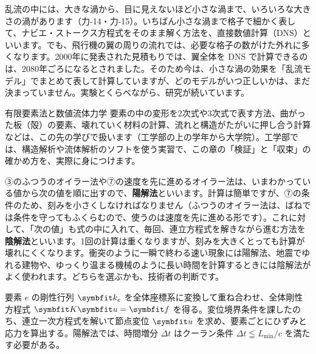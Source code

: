 \begin{phmada}
乱流の中には、大きな渦から、目に見えないほど小さな渦まで、いろいろな大きさの渦があります（力-14・力-15）。いちばん小さな渦まで格子で細かく表して、ナビエ・ストークス方程式をそのまま解く方法を、直接数値計算（DNS）といいます。でも、飛行機の翼の周りの流れでは、必要な格子の数がけた外れに多くなります。2000年に発表された見積もりでは、翼全体を DNS で計算できるのは、2080年ごろになるとされました。そのため今は、小さな渦の効果を「乱流モデル」でまとめて表して計算していますが、どのモデルがいつ正しいかは、まだ決まっていません。実験とくらべながら、研究が続いています。
\end{phmada}
\begin{phsaki}{有限要素法と数値流体力学}
要素の中の変形を2次式や3次式で表す方法、曲がった板（殻）の要素、壊れていく材料の計算、流れと構造がたがいに押し合う計算などは、この先の学びで扱います（工学部の上の学年から大学院）。工学部では、構造解析や流体解析のソフトを使う実習で、この章の「検証」と「収束」の確かめ方を、実際に身につけます。
\end{phsaki}
\begin{motto}[5]
③のふつうのオイラー法や⑦の速度を先に進めるオイラー法は、いまわかっている値から次の値を順に出すので、\textbf{陽解法}といいます。計算は簡単ですが、⑦の条件のため、刻みを小さくしなければなりません（ふつうのオイラー法は、ばねでは条件を守ってもふくらむので、使うのは速度を先に進める形です）。これに対して、「次の値」も式の中に入れて、毎回、連立方程式を解きながら進む方法を\textbf{陰解法}といいます。1回の計算は重くなりますが、刻みを大きくとっても計算が壊れにくくなります。衝突のように一瞬で終わる速い現象には陽解法、地震でゆれる建物や、ゆっくり温まる機械のように長い時間を計算するときには陰解法がよく使われます。どちらを選ぶかも、技術者の判断です。
\end{motto}

\begin{senmonsho}[有限要素法の書き方]
\begin{bkhonbun}
要素 $e$ の剛性行列 $\symbfit k_e$ を全体座標系に変換して重ね合わせ、全体剛性方程式 $\symbfit K\symbfit u=\symbfit f$ を得る。変位境界条件を課したのち、連立一次方程式を解いて節点変位 $\symbfit u$ を求め、要素ごとにひずみと応力を算出する。陽解法では、時間増分 $\Delta t$ はクーラン条件 $\Delta t\leqq L_{\min}/c$ を満たす必要がある。
\end{bkhonbun}
\end{senmonsho}

